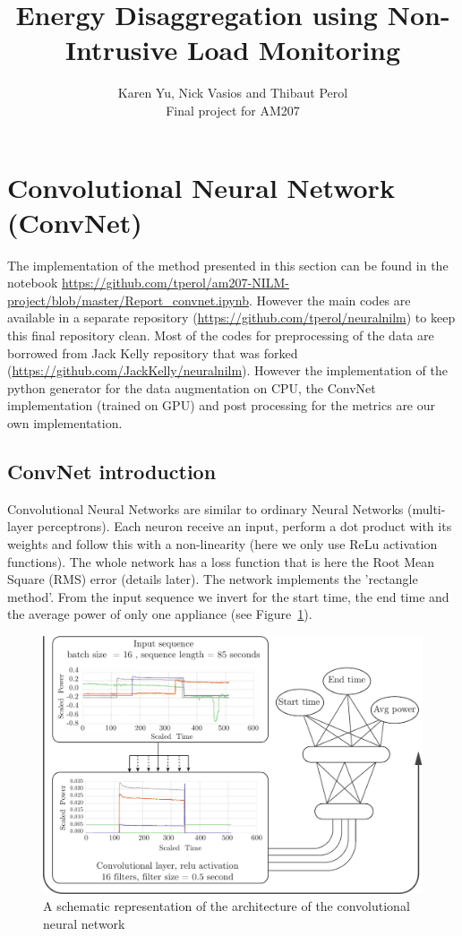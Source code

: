 \documentclass[11pt]{article}
\title{Energy Disaggregation using Non-Intrusive Load Monitoring}
\author{Karen Yu, Nick Vasios and Thibaut Perol\\ \small Final project for AM207}
\date{}
\begin{document}
\maketitle


\section{Convolutional Neural Network (ConvNet)}
The implementation of the method presented in this section can be found in the notebook \url{https://github.com/tperol/am207-NILM-project/blob/master/Report_convnet.ipynb}. However the main codes are available in a separate repository (\url{https://github.com/tperol/neuralnilm}) to keep this final repository clean. Most of the codes for preprocessing of the data are borrowed from Jack Kelly repository that was forked (\url{https://github.com/JackKelly/neuralnilm}). However the implementation of the python generator for the data augmentation on CPU, the ConvNet implementation (trained on GPU) and post processing for the metrics are our own implementation.

\subsection{ConvNet introduction}
Convolutional Neural Networks are similar to ordinary Neural Networks (multi-layer perceptrons). Each neuron receive an input, perform a dot product with its weights and follow this with a non-linearity (here we only use ReLu activation functions). The whole network has a loss function that is here the Root Mean Square (RMS) error (details later). The network implements the 'rectangle method'. From the input sequence we invert for the start time, the end time and the average power of only one appliance (see Figure~\ref{convnet_architecture}).

\begin{figure}
\begin{center}
\includegraphics[width=29 pc]{./../poster/Figures/convnet_architecture}
\caption{A schematic representation of the architecture of the convolutional neural network}
\label{convnet_architecture}
\end{center}
\end{figure}
\end{document}
